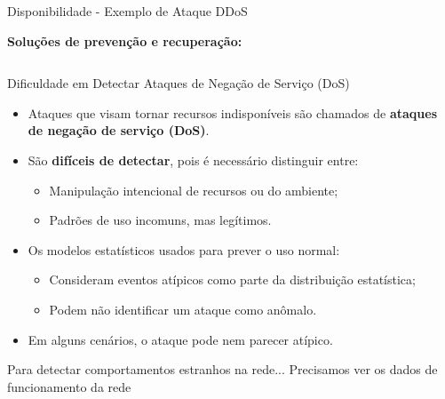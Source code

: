 \begin{frame}{Disponibilidade - Exemplo de Ataque DDoS}
\begin{block}{\textbf{Soluções de prevenção e recuperação:}}
\begin{columns}
\begin{column}{0.5\textwidth}
      \end{column}
    \end{columns}
  \end{block}


\end{frame}

\begin{frame}{Dificuldade em Detectar Ataques de Negação de Serviço (DoS)}
    \begin{itemize}
        \item Ataques que visam tornar recursos indisponíveis são chamados de \textbf{ataques de negação de serviço (DoS)}.
        \item São \textbf{difíceis de detectar}, pois é necessário distinguir entre:
        \begin{itemize}
            \item Manipulação intencional de recursos ou do ambiente;
            \item Padrões de uso incomuns, mas legítimos.
        \end{itemize}
        \item Os modelos estatísticos usados para prever o uso normal:
        \begin{itemize}
            \item Consideram eventos atípicos como parte da distribuição estatística;
            \item Podem não identificar um ataque como anômalo.
        \end{itemize}
        \item Em alguns cenários, o ataque pode nem parecer atípico.
    \end{itemize}

    \begin{block}{Para detectar comportamentos estranhos na rede...}
        Precisamos ver os dados de funcionamento da rede
    \end{block}
\end{frame}

